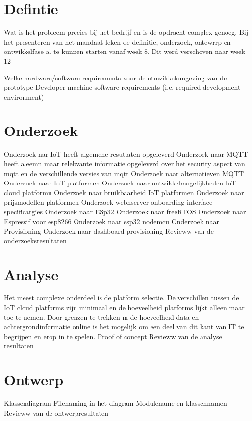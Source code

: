 		\section{Defintie}
		
		Wat is het probleem precies bij het bedrijf en is de opdracht complex genoeg. Bij het presenteren van het mandaat leken de definitie, onderzoek, ontewrrp en ontwikkelfase al te kunnen starten vanaf week 8. Dit werd verschoven naar week 12
		
		Welke hardware/software requirements voor de otnwikkelomgeving van de prototype
		Developer machine software requirements (i.e. required development environment)
		
		\section{Onderzoek}
		Onderzoek nar IoT heeft algemene resutlaten opgeleverd
		Onderzoek naar MQTT heeft aleemn maar relebvante informatie opgeleverd over het security aspect van mqtt en de verschillende  versies van mqtt
		Onderzoek naar alternatieven MQTT
		Onderzoek naar IoT platformen
		Onderzoek naar ontwikkelmogelijkheden IoT cloud platformn
		Onderzoek naar bruikbaarheid IoT platformen
		Onderzoek naar prijsmodellen platformen
		Onderzoek webnserver onboarding interface specificatgies
		Onderzoek naar ESp32
		Onderzoek naar freeRTOS
		Onderzoek naar Espressif voor esp8266
		Onderzoek naar esp32 nodemcu
		Onderzoek naar Provisioning
		Onderzoek naar dashboard provisioning
		Revieww van de onderzoeksresultaten
		
		
		\section{Analyse}
		
		Het meest complexe onderdeel is de platform selectie. De verschillen tussen de IoT cloud platforms zijn minimaal en de hoeveelheid platforms lijkt alleen maar toe te nemen. Door grenzen te trekken in de hoeveelheid data en achtergrondinformatie online is het mogelijk om een deel van dit kant van IT te begrijpen en erop in te spelen.
		Proof of concept
		Revieww van de analyse resultaten
		
		
		\section{Ontwerp}
		
		Klassendiagram
		Filenaming in het diagram
		Modulename en klassennamen
		Revieww van de ontwerpresultaten
		
